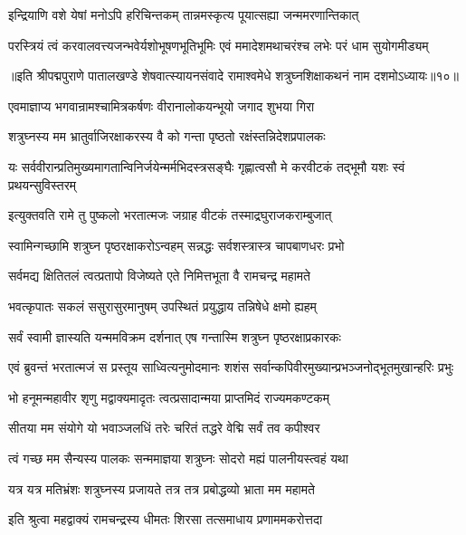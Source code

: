 \twolineshloka
{इन्द्रियाणि वशे येषां मनोऽपि हरिचिन्तकम्}
{तान्नमस्कृत्य पूयात्सह्या जन्ममरणान्तिकात्}%

\twolineshloka
{परस्त्रियं त्वं करवालवत्त्यजन्भवेर्यशोभूषणभूतिभूमिः}
{एवं ममादेशमथाचरंश्च लभेः परं धाम सुयोगमीड्यम्}%

॥इति श्रीपद्मपुराणे पातालखण्डे शेषवात्स्यायनसंवादे रामाश्वमेधे शत्रुघ्नशिक्षाकथनं नाम दशमोऽध्यायः॥१०॥



\twolineshloka
{एवमाज्ञाप्य भगवान्रामश्चामित्रकर्षणः}
{वीरानालोकयन्भूयो जगाद शुभया गिरा}%

\twolineshloka
{शत्रुघ्नस्य मम भ्रातुर्वाजिरक्षाकरस्य वै}
{को गन्ता पृष्ठतो रक्षंस्तन्निदेशप्रपालकः}%

\twolineshloka
{यः सर्ववीरान्प्रतिमुख्यमागतान्विनिर्जयेन्मर्मभिदस्त्रसङ्घैः}
{गृह्णात्वसौ मे करवीटकं तद्भूमौ यशः स्वं प्रथयन्सुविस्तरम्}%

\twolineshloka
{इत्युक्तवति रामे तु पुष्कलो भरतात्मजः}
{जग्राह वीटकं तस्माद्रघुराजकराम्बुजात्}%

\twolineshloka
{स्वामिन्गच्छामि शत्रुघ्न पृष्ठरक्षाकरोऽन्वहम्}
{सन्नद्धः सर्वशस्त्रास्त्र चापबाणधरः प्रभो}%

\twolineshloka
{सर्वमद्य क्षितितलं त्वत्प्रतापो विजेष्यते}
{एते निमित्तभूता वै रामचन्द्र महामते}%

\twolineshloka
{भवत्कृपातः सकलं ससुरासुरमानुषम्}
{उपस्थितं प्रयुद्धाय तन्निषेधे क्षमो ह्यहम्}%

\twolineshloka
{सर्वं स्वामी ज्ञास्यति यन्ममविक्रम दर्शनात्}
{एष गन्तास्मि शत्रुघ्न पृष्ठरक्षाप्रकारकः}%

\twolineshloka
{एवं ब्रुवन्तं भरतात्मजं स प्रस्तूय साध्वित्यनुमोदमानः}
{शशंस सर्वान्कपिवीरमुख्यान्प्रभञ्जनोद्भूतमुखान्हरिः प्रभुः}%

\twolineshloka
{भो हनूमन्महावीर शृणु मद्वाक्यमादृतः}
{त्वत्प्रसादान्मया प्राप्तमिदं राज्यमकण्टकम्}%

\twolineshloka
{सीतया मम संयोगे यो भवाञ्जलधिं तरेः}
{चरितं तद्धरे वेद्मि सर्वं तव कपीश्वर}%

\twolineshloka
{त्वं गच्छ मम सैन्यस्य पालकः सन्ममाज्ञया}
{शत्रुघ्नः सोदरो मह्यं पालनीयस्त्वहं यथा}%

\twolineshloka
{यत्र यत्र मतिभ्रंशः शत्रुघ्नस्य प्रजायते}
{तत्र तत्र प्रबोद्धव्यो भ्राता मम महामते}%

\twolineshloka
{इति श्रुत्वा महद्वाक्यं रामचन्द्रस्य धीमतः}
{शिरसा तत्समाधाय प्रणाममकरोत्तदा}%

